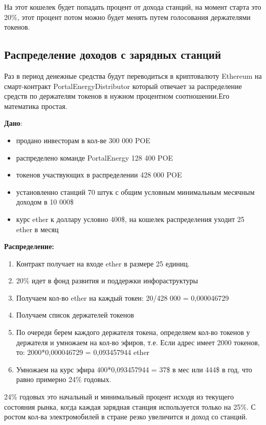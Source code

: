 \documentclass[a4paper,12pt]{report}
\begin{document}
На этот кошелек будет попадать процент от дохода станций, на момент старта это 20\%, этот процент потом можно будет менять путем голосования держателями токенов. 


\subsection{Распределение доходов с зарядных станций }
\label{capital}
Раз в период денежные средства будут переводиться в криптовалюту Ethereum на смарт-контракт PortalEnergyDistributor который отвечает за распределение средств по держателям токенов в нужном процентном соотношении.Его математика простая.

\textbf{Дано}:



\begin{itemize}
	\item продано инвесторам в кол-ве 300 000 POE
	\item распределено команде PortalEnergy 128 400 POE
	\item токенов участвующих в распределении 428 000 POE
	\item установленно станций 70 штук с общим условным минимальным месячным доходом в 10 000\$
	\item курс ether к доллару условно 400\$,  на кошелек распределения уходит 25 ether в месяц
\end{itemize}

\textbf{Распределение:}

\begin{enumerate}
	\item Контракт получает на входе ether в размере 25 единиц.
	\item 20\% идет в фонд развития и поддержки инфораструктуры
	\item Получаем кол-во ether на каждый токен: 20/428 000 = 0,000046729
	\item Получаем список держателей токенов
	\item По очереди берем каждого держателя токена, определяем кол-во токенов у держателя и умножаем на кол-во эфиров, т.е. Если адрес имеет 2000 токенов, то: 2000*0,000046729 = 0,093457944 ether
	\item Умножаем на курс эфира 400*0,093457944 = 37\$ в мес или 444\$ в год, что равно примерно 24\% годовых. 
\end{enumerate}



24\% годовых это начальный и минимальный процент исходя из текущего состояния рынка, когда каждая зарядная станция используется только на 25\%. С ростом кол-ва электромобилей в стране резко увеличится и доход со станций.  
\end{document}

